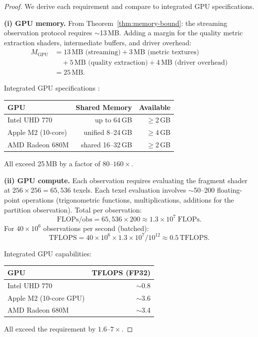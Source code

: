 \documentclass[11pt,twocolumn,a4paper]{article}
\newcommand{\Mgpu}{M_{\mathrm{GPU}}}
\begin{document}
\begin{proof}
We derive each requirement and compare to integrated GPU
specifications.

\textbf{(i) GPU memory.}
From Theorem~\ref{thm:memory-bound}: the streaming observation
protocol requires $\sim$13\,MB. Adding a margin for the quality
metric extraction shaders, intermediate buffers, and driver overhead:
\begin{align}
\Mgpu &= 13\,\text{MB (streaming)}
  + 3\,\text{MB (metric textures)} \nonumber\\
&\quad + 5\,\text{MB (quality extraction)}
  + 4\,\text{MB (driver overhead)} \nonumber\\
&= 25\,\text{MB}.
\end{align}

Integrated GPU specifications \citep{inteluhd770,applem2,amdradeon680m}:
\begin{center}
\begin{tabular}{lrr}
\toprule
\textbf{GPU} & \textbf{Shared Memory} & \textbf{Available} \\
\midrule
Intel UHD 770 & up to 64\,GB & $\geq$2\,GB \\
Apple M2 (10-core) & unified 8--24\,GB & $\geq$4\,GB \\
AMD Radeon 680M & shared 16--32\,GB & $\geq$2\,GB \\
\bottomrule
\end{tabular}
\end{center}
All exceed 25\,MB by a factor of $80$--$160\times$.

\textbf{(ii) GPU compute.}
Each observation requires evaluating the fragment shader at
$256 \times 256 = 65{,}536$ texels. Each texel evaluation involves
$\sim$50--200 floating-point operations (trigonometric functions,
multiplications, additions for the partition observation). Total per
observation:
\begin{equation}
\text{FLOPs/obs} = 65{,}536 \times 200
  \approx 1.3 \times 10^7 \;\text{FLOPs}.
\end{equation}
For $40 \times 10^6$ observations per second (batched):
\begin{equation}
\text{TFLOPS} = 40 \times 10^6 \times 1.3 \times 10^7
  / 10^{12} \approx 0.5\,\text{TFLOPS}.
\end{equation}

Integrated GPU capabilities:
\begin{center}
\begin{tabular}{lr}
\toprule
\textbf{GPU} & \textbf{TFLOPS (FP32)} \\
\midrule
Intel UHD 770 & $\sim$0.8 \\
Apple M2 (10-core GPU) & $\sim$3.6 \\
AMD Radeon 680M & $\sim$3.4 \\
\bottomrule
\end{tabular}
\end{center}
All exceed the requirement by $1.6$--$7\times$.


\end{proof}
\end{document}
